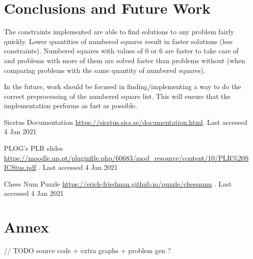 \documentclass[runningheads]{llncs}
\begin{document}
\section{Conclusions and Future Work}
The constraints implemented are able to find solutions to any problem fairly
quickly. Lower quantities of numbered squares result in faster solutions
(less constraints). Numbered squares with values of 0 or 6 are faster to
take care of and problems with more of them are solved faster than problems
without (when comparing problems with the same quantity of numbered squares).

In the future, work should be focused in finding/implementing a way to do the
correct preprocessing of the numbered square list. This will ensure that the
implementation performs as fast as possible.

\begin{thebibliography}{8}
    Sicstus Documentation
        \href{https://sicstus.sics.se/documentation.html}{https://sicstus.sics.se/documentation.html}.
        Last accessed 4 Jan 2021

    PLOG's PLR slides 
    \href{https://moodle.up.pt/pluginfile.php/60683/mod\_resource/content/10/PLR\%20SICStus.pdf}{https://moodle.up.pt/pluginfile.php/60683/mod\_resource/content/10/PLR\%20SICStus.pdf}
    . Last accessed 4 Jan 2021

    Chess Num Puzzle 
    \href{https://erich-friedman.github.io/puzzle/chessnum}{https://erich-friedman.github.io/puzzle/chessnum}
    . Last accessed 4 Jan 2021
\end{thebibliography}

\section{Annex}

// TODO source code + extra graphs + problem gen ?
\end{document}
